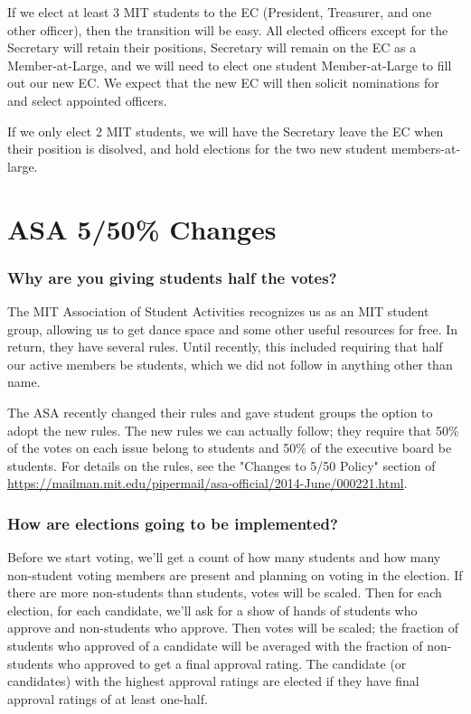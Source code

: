 \documentclass{article}
\begin{document}
If we elect at least 3 MIT students to the EC (President, Treasurer, and one other officer), then the transition will be easy. All elected officers except for the Secretary will retain their positions, Secretary will remain on the EC as a Member-at-Large, and we will need to elect one student Member-at-Large to fill out our new EC. We expect that the new EC will then solicit nominations for and select appointed officers.

If we only elect 2 MIT students, we will have the Secretary leave the EC when their position is disolved, and hold elections for the two new student members-at-large.


\section{ASA 5/50\% Changes}

\subsubsection*{Why are you giving students half the votes?}
The MIT Association of Student Activities recognizes us as an MIT student group, allowing us to get dance space and some other useful resources for free. In return, they have several rules. Until recently, this included requiring that half our active members be students, which we did not follow in anything other than name.

The ASA recently changed their rules and gave student groups the option to adopt the new rules. The new rules we can actually follow; they require that 50\% of the votes on each issue belong to students and 50\% of the executive board be students. For details on the rules, see the "Changes to 5/50 Policy" section of \url{https://mailman.mit.edu/pipermail/asa-official/2014-June/000221.html}.

\subsubsection*{How are elections going to be implemented?}
Before we start voting, we'll get a count of how many students and how many non-student voting members are present and planning on voting in the election. If there are more non-students than students, votes will be scaled.  Then for each election, for each candidate, we'll ask for a show of hands of students who approve and non-students who approve. Then votes will be scaled; the fraction of students who approved of a candidate will be averaged with the fraction of non-students who approved to get a final approval rating. The candidate (or candidates) with the highest approval ratings are elected if they have final approval ratings of at least one-half.
\end{document}
